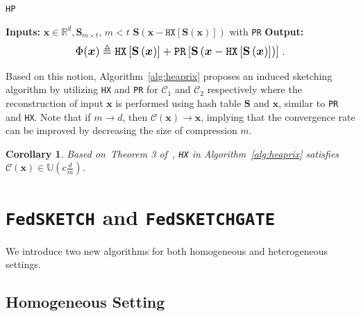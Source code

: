 \documentclass[sigconf, anonymous, review]{acmart}
\newtheorem{corollary}{Corollary}
\newcommand*{\Resize}[2]{\resizebox{#1}{!}{$#2$}}%
\begin{document}
\begin{algorithm}[H]
\caption{\texttt{HP} }\label{alg:heaprix}
\begin{algorithmic}[1]
\STATE \textbf{Inputs:} $\boldsymbol{x}\in\mathbb{R}^{d}, \mathbf{S}_{m\times t}$, $m<t$
 $\mathbf{S}\left(\boldsymbol{x} - \texttt{HX}[\mathbf{S}(\boldsymbol{x})]\right)$ with \texttt{PR} 
\STATE \textbf{Output:}
\vspace{- 0.1cm}
\[ \Resize{7.4cm}{\Phi(\boldsymbol{x})\triangleq\texttt{HX}\left[\mathbf{S}\left(\boldsymbol{x}\right)\right]+\texttt{PR}\left[\mathbf{S}\left(\boldsymbol{x}-\texttt{HX}\left[\mathbf{S}\left(\boldsymbol{x}\right)\right]\right)\right]}\ .\]
\end{algorithmic}
\end{algorithm}
\vspace{-0.1in}
Based on this notion, Algorithm~\ref{alg:heaprix} proposes an induced sketching algorithm by utilizing \texttt{HX} and \texttt{PR} for $\mathcal{C}_1$ and $\mathcal{C}_2$ respectively where the reconstruction of input $\mathbf{x}$ is performed using hash table $\mathbf{S}$ and $\mathbf{x}$, similar to \texttt{PR} and \texttt{HX}.
Note that if $m\rightarrow d$, then $\mathcal{C}(\boldsymbol{x})\rightarrow \boldsymbol{x}$, implying that the convergence rate  can be improved by decreasing the size of compression $m$. 
\begin{corollary}\label{cor:small}
Based on~Theorem 3 of~\citep{horvath2020better}, \texttt{HX} in Algorithm~\ref{alg:heaprix} satisfies $\mathcal{C}(\boldsymbol{x})\in \mathbb{U}(c \frac{d}{m})$. 
\end{corollary}


\section{\texttt{FedSKETCH} and \texttt{FedSKETCHGATE}}\label{sec:algos}

We introduce two new algorithms for both homogeneous and heterogeneous settings.




\subsection{Homogeneous Setting}
\end{document}
